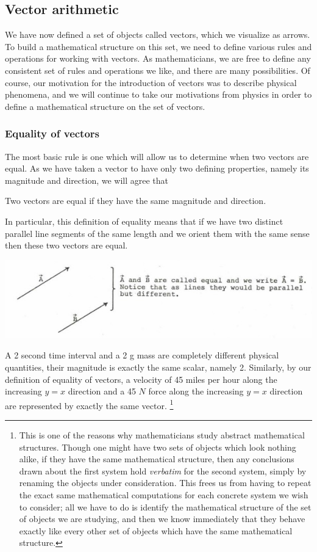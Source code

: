 \documentclass[12pt,letterpaper,reqno]{article}
\numberwithin{equation}{section}
\newcommand{\ti}[1]{\textit{#1}}
\begin{document}
\subsection{Vector arithmetic}
We have now defined a set of objects called vectors, which we visualize as arrows. To build a mathematical structure on this set, we need to define various rules and operations for working with vectors. As mathematicians, we are free to define any consistent set of rules and operations we like, and there are many possibilities.  Of course, our motivation for the introduction of vectors was to describe physical phenomena, and we will continue to take our motivations from physics in order to define a mathematical structure on the set of vectors.

\subsubsection{Equality of vectors}
The most basic rule is one which will allow us to determine when two vectors are equal. As we have taken a vector to have only two defining properties, namely its magnitude and direction, we will agree that
\begin{defn}
Two vectors are equal if they have the same magnitude and direction.	
\end{defn}
In particular, this definition of equality means that if we have two distinct parallel line segments of the same length and we orient them with the same sense then these two vectors are equal.
\begin{center}
	\includegraphics[scale=0.5]{figures_mvc/equal_vectors_new}
\end{center}
\begin{example}
A 2 second time interval and a 2 g mass are completely different physical quantities, their magnitude is exactly the same scalar, namely 2. Similarly, by our definition of equality of vectors, a velocity of 45 miles per hour along the increasing $y=x$ direction and a 45 $N$ force along the increasing $y=x$ direction are represented by exactly the same vector. \footnote{This is one of the reasons why mathematicians study abstract mathematical structures. Though one might have two sets of objects which look nothing alike, if they have the same mathematical structure, then any conclusions drawn about the first system hold \ti{verbatim} for the second system, simply by renaming the objects under consideration. This frees us from having to repeat the exact same mathematical computations for each concrete system we wish to consider; all we have to do is identify the mathematical structure of the set of objects we are studying, and then we know immediately that they behave exactly like every other set of objects which have the same mathematical structure.} 
\end{example}
\end{document}
